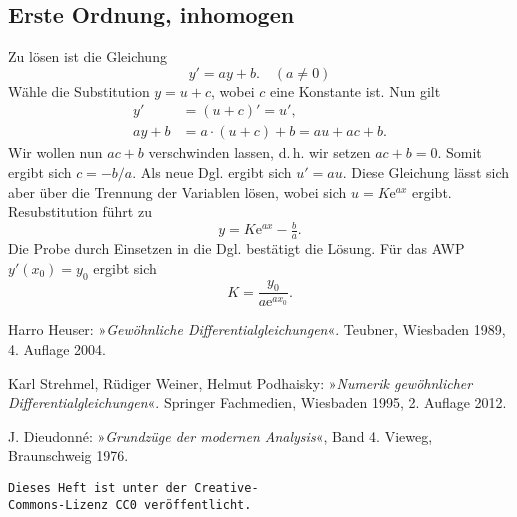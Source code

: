 \documentclass[a4paper,10pt,fleqn,twocolumn,twoside,openany]{article}
\numberwithin{equation}{section}
\newcommand{\ee}{\mathrm e}
\theoremstyle{definition}
\begin{document}
\subsection{Erste Ordnung, inhomogen}
Zu lösen ist die Gleichung
\begin{equation}
y' = ay+b.\quad (a\ne 0)
\end{equation}
Wähle die Substitution $y=u+c$, wobei
$c$ eine Konstante ist. Nun gilt
\begin{align}
y' &= (u+c)' = u',\\
ay+b &= a\cdot (u+c)+b = au+ac+b.
\end{align}
Wir wollen nun $ac+b$ verschwinden lassen, d.\,h. wir setzen
$ac+b=0$. Somit ergibt sich $c=-b/a$. Als neue Dgl. ergibt sich
$u' = au$. Diese Gleichung lässt sich aber über die Trennung
der Variablen lösen, wobei sich $u=K\ee^{ax}$ ergibt. Resubstitution
führt zu
\begin{equation}
y = K\ee^{ax}-\tfrac{b}{a}.
\end{equation}
Die Probe durch Einsetzen in die Dgl. bestätigt die Lösung.
Für das AWP $y'(x_0)=y_0$ ergibt sich
\begin{equation}
K = \frac{y_0}{a\ee^{ax_0}}.
\end{equation}

\begin{thebibliography}{x}
 Harro Heuser: »\emph{Gewöhnliche
Differentialgleichungen}«. Teubner, Wiesbaden 1989, 4. Auflage 2004.

 Karl Strehmel, Rüdiger Weiner, Helmut Podhaisky:
»\emph{Numerik gewöhnlicher Differentialgleichungen}«. Springer
Fachmedien, Wiesbaden 1995, 2. Auflage 2012.

 J. Dieudonné:
»\emph{Grundzüge der modernen Analysis}«, Band 4.
Vieweg, Braunschweig 1976.
\end{thebibliography}

\vfill
\noindent
\texttt{Dieses Heft ist unter der Creative-\\
Commons-Lizenz CC0 veröffentlicht.}
\end{document}
